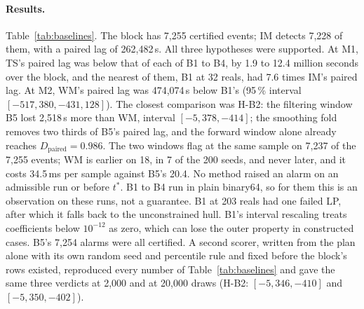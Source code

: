 \documentclass[11pt,a4paper]{article}
\newcommand{\Dp}{D_{\mathrm{paired}}}
\newcommand{\tstar}{t^{\ast}}
\begin{document}
\paragraph{Results.} Table~\ref{tab:baselines}. The block has 7,255 certified events; IM detects 7,228 of them, with a
paired lag of 262,482\,s. All three hypotheses were supported. At M1, TS's paired lag was below that of each of B1 to
B4, by 1.9 to 12.4 million seconds over the block, and the nearest of them, B1 at 32 reals, had 7.6 times IM's paired
lag. At M2, WM's paired lag was 474,074\,s below B1's (95\,\% interval $[-517{,}380, -431{,}128]$). The closest
comparison was H-B2: the filtering window B5 lost 2,518\,s more than WM, interval $[-5{,}378, -414]$; the smoothing
fold removes two thirds of B5's paired lag, and the forward window alone already reaches $\Dp = 0.986$. The two
windows flag at the same sample on 7,237 of the 7,255 events; WM is earlier on 18, in 7 of the 200 seeds, and never
later, and it costs 34.5\,ms per sample against B5's 20.4. No method raised
an alarm on an admissible run or before $\tstar$. B1 to B4 run in plain binary64, so for them this is an observation on
these runs, not a guarantee. B1 at 203 reals had one failed LP, after which it falls back to the unconstrained hull. B1's interval rescaling
treats coefficients below $10^{-12}$ as zero, which can lose the outer property in constructed cases. B5's
7,254 alarms were all certified. A second scorer, written from the plan alone with its own random seed and percentile
rule and fixed before the block's rows existed, reproduced every number of Table~\ref{tab:baselines} and gave the
same three verdicts at 2,000 and at 20,000 draws (H-B2: $[-5{,}346, -410]$ and $[-5{,}350, -402]$).
\end{document}
